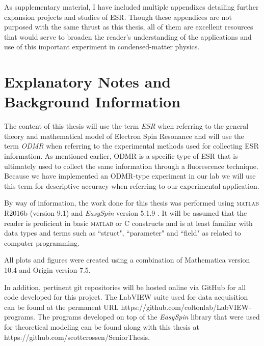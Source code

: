\documentclass[oneside, astronomy, noacknowlegments]{BYUPhys}
\begin{document}
As supplementary material, I have included multiple appendixes detailing further expansion projects and studies of ESR. Though these appendices are not purposed with the same thrust as this thesis, all of them are excellent resources that would serve to broaden the reader's understanding of the applications and use of this important experiment in condensed-matter physics.

\section{Explanatory Notes and Background Information}

The content of this thesis will use the term \textit{ESR} when referring to the general theory and mathematical model of Electron Spin Resonance and will use the term \textit{ODMR} when referring to the experimental methods used for collecting ESR information. As mentioned earlier, ODMR is a specific type of ESR that is ultimately used to collect the same information through a fluorescence technique. Because we have implemented an ODMR-type experiment in our lab we will use this term for descriptive accuracy when referring to our experimental application.

By way of information, the work done for this thesis was performed using \textsc{matlab} R2016b (version 9.1) and \textit{EasySpin} version 5.1.9 . It will be assumed that the reader is proficient in basic \textsc{matlab} or C constructs and is at least familiar with data types and terms such as ``struct", ``parameter" and ``field" as related to computer programming.

All plots and figures were created using a combination of Mathematica version 10.4 and Origin version 7.5.

In addition, pertinent git repositories will be hosted online via GitHub for all code developed for this project. The LabVIEW suite used for data acquisition can be found at the permanent URL https://github.com/coltonlab/LabVIEW-programs. The programs developed on top of the \textit{EasySpin} library that were used for theoretical modeling can be found along with this thesis at https://github.com/scottcrossen/SeniorThesis.
\end{document}

